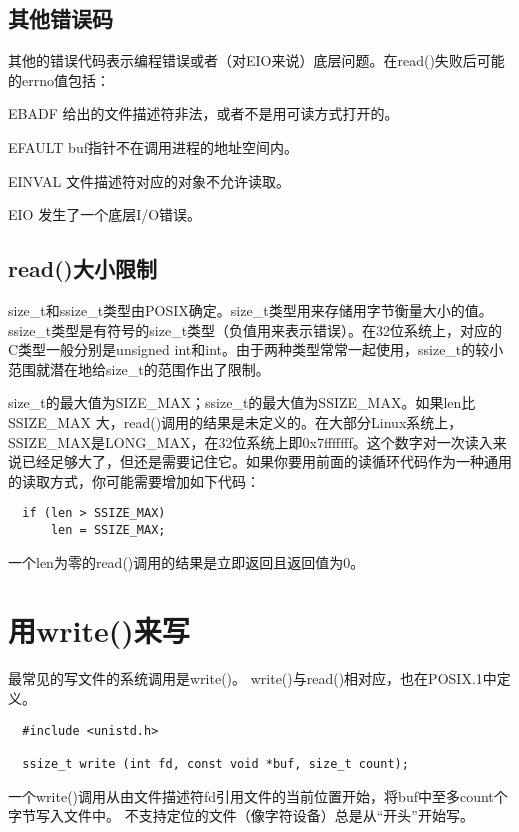 \subsection{其他错误码}
其他的错误代码表示编程错误或者（对EIO来说）底层问题。在read()失败后可能的errno值包括： 

\begin{eqlist*}
\item [EBADF]
给出的文件描述符非法，或者不是用可读方式打开的。 
\item [EFAULT]
buf指针不在调用进程的地址空间内。
\item [EINVAL]
文件描述符对应的对象不允许读取。 
\item [EIO]
发生了一个底层I/O错误。
\end{eqlist*}

\subsection{read()大小限制}
size\_t和ssize\_t类型由POSIX确定。size\_t类型用来存储用字节衡量大小的值。ssize\_t类型是有符号的size\_t类型（负值用来表示错误）。在32位系统上，对应的C类型一般分别是unsigned int和int。由于两种类型常常一起使用，ssize\_t的较小范围就潜在地给size\_t的范围作出了限制。

size\_t的最大值为SIZE\_MAX；ssize\_t的最大值为SSIZE\_MAX。如果len比SSIZE\_MAX 大，read()调用的结果是未定义的。在大部分Linux系统上，SSIZE\_MAX是LONG\_MAX，在32位系统上即0x7fffffff。这个数字对一次读入来说已经足够大了，但还是需要记住它。如果你要用前面的读循环代码作为一种通用的读取方式，你可能需要增加如下代码：

\begin{lstlisting}
  if (len > SSIZE_MAX)
      len = SSIZE_MAX;
\end{lstlisting}

一个len为零的read()调用的结果是立即返回且返回值为0。 

\section{用write()来写}

最常见的写文件的系统调用是write()。 write()与read()相对应，也在POSIX.1中定义。 

\begin{lstlisting}
  #include <unistd.h>

  ssize_t write (int fd, const void *buf, size_t count);
\end{lstlisting}

一个write()调用从由文件描述符fd引用文件的当前位置开始，将buf中至多count个字节写入文件中。 不支持定位的文件（像字符设备）总是从“开头”开始写。

